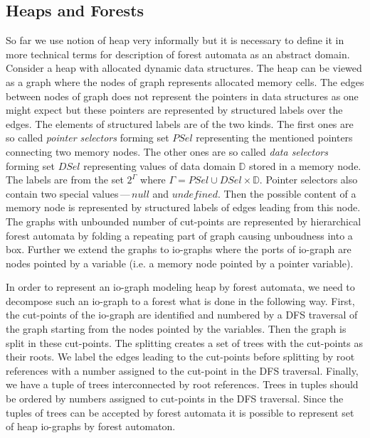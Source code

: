 \documentclass[a4paper, 12pt]{article}
\begin{document}
\subsection{Heaps and Forests}
So far we use notion of heap very informally but it is necessary to define
it in more technical terms for description of forest automata as an abstract domain.
Consider a heap with allocated dynamic data structures.
The heap can be viewed as a graph where the nodes of graph represents
allocated memory cells.
The edges between nodes of graph does not represent the pointers in data structures
as one might expect but these pointers are represented by structured labels over the edges.
The elements of structured labels are of the two kinds.
The first ones are so called \emph{pointer selectors} forming set $PSel$ representing
the mentioned pointers connecting two memory nodes.
The other ones are so called \emph{data selectors} forming set $DSel$ representing
values of data domain $\mathbb{D}$ stored in a memory node.
The labels are from the set $2^\Gamma$ where $\Gamma = PSel \cup DSel \times \mathbb{D}$.
Pointer selectors also contain two special values\,---\,$null$ and $undefined$.
Then the possible content of a memory node is represented by structured labels of
edges leading from this node.
The graphs with unbounded number of cut-points are represented by hierarchical
forest automata by folding a repeating part of graph causing unboudness into a box.
Further we extend the graphs to io-graphs where the ports of io-graph are nodes pointed
by a variable (i.e. a memory node pointed by a pointer variable).

In order to represent an io-graph modeling heap by forest automata,
we need to decompose such an io-graph to a forest what is done in the following way.
First, the cut-points of the io-graph are identified and numbered by
a DFS traversal of the graph starting from the nodes pointed by the variables.
Then the graph is split in these cut-points.
The splitting creates a set of trees with the cut-points as their roots.
We label the edges leading to the cut-points before splitting by root
references with a number assigned to the cut-point in the DFS traversal.
Finally, we have a tuple of trees interconnected by root references.
Trees in tuples should be ordered by numbers assigned to cut-points in the DFS traversal.
Since the tuples of trees can be accepted by forest automata it is
possible to represent set of heap io-graphs by forest automaton.
\end{document}
